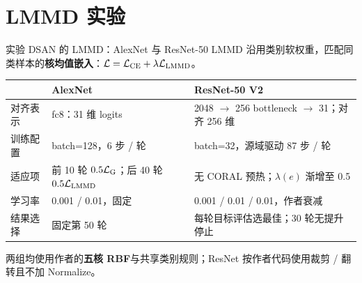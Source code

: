 \section{LMMD 实验}

\begin{frame}[t]{实验 DSAN 的 LMMD：AlexNet 与 ResNet-50}
\small
LMMD 沿用类别软权重，匹配同类样本的\textbf{核均值嵌入}：$\mathcal L=\mathcal L_{\mathrm{CE}}+\lambda\mathcal L_{\mathrm{LMMD}}$。
\vspace{2mm}
\begin{tabularx}{\linewidth}{@{}P{26mm}YY@{}}
\toprule
 & AlexNet & ResNet-50 V2 \\
\midrule
对齐表示 & fc8：31 维 logits & 2048 $\to$ 256 bottleneck $\to$ 31；对齐 256 维 \\
训练配置 & batch=128，6 步 / 轮 & batch=32，源域驱动 87 步 / 轮 \\
适应项 & 前 10 轮 $0.5\mathcal L_{\mathrm{G}}$；后 40 轮 $0.5\mathcal L_{\mathrm{LMMD}}$ & 无 CORAL 预热；$\lambda(e)$ 渐增至 0.5 \\
学习率 & 0.001 / 0.01，固定 & 0.001 / 0.01 / 0.01，作者衰减 \\
结果选择 & 固定第 50 轮 & 每轮目标评估选最佳；30 轮无提升停止 \\
\bottomrule
\end{tabularx}
\vspace{3mm}
两组均使用作者的\textbf{五核 RBF}与共享类别规则；ResNet 按作者代码使用裁剪 / 翻转且不加 Normalize。
\end{frame}
